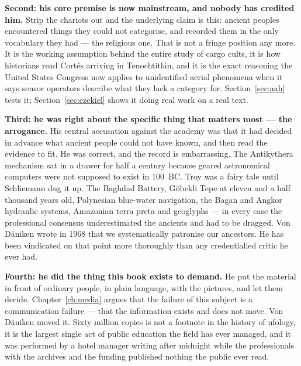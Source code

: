 \textbf{Second: his core premise is now mainstream, and nobody has credited him.} Strip the
chariots out and the underlying claim is this: ancient peoples encountered things they could not
categorise, and recorded them in the only vocabulary they had --- the religious one. That is not a
fringe position any more. It is the working assumption behind the entire study of cargo cults, it
is how historians read Cortés arriving in Tenochtitlán, and it is the exact reasoning the United
States Congress now applies to unidentified aerial phenomena when it says sensor operators
describe what they lack a category for.  Section~\ref{sec:aah} tests it; Section~\ref{sec:ezekiel} shows it doing real
work on a real text.

\textbf{Third: he was right about the specific thing that matters most --- the arrogance.} His
central accusation against the academy was that it had decided in advance what ancient people
could not have known, and then read the evidence to fit. He was correct, and the record is
embarrassing. The Antikythera mechanism sat in a drawer for half a century because geared
astronomical computers were not supposed to exist in 100~BC. Troy was a fairy tale until Schliemann
dug it up. The Baghdad Battery, Göbekli Tepe at eleven and a half thousand years old, Polynesian
blue-water navigation, the Bagan and Angkor hydraulic systems, Amazonian terra preta and
geoglyphs --- in every case the professional consensus underestimated the ancients and had to be
dragged. Von Däniken wrote in 1968 that we systematically patronise our ancestors. He has been
vindicated on that point more thoroughly than any credentialled critic he ever had.

\textbf{Fourth: he did the thing this book exists to demand.} He put the material in front of
ordinary people, in plain language, with the pictures, and let them decide. Chapter~\ref{ch:media}
argues that the failure of this subject is a communication failure --- that the information exists
and does not move. Von Däniken moved it. Sixty million copies is not a footnote in the history of
ufology, it is the largest single act of public education the field has ever managed, and it was
performed by a hotel manager writing after midnight while the professionals with the archives and
the funding published nothing the public ever read. 


